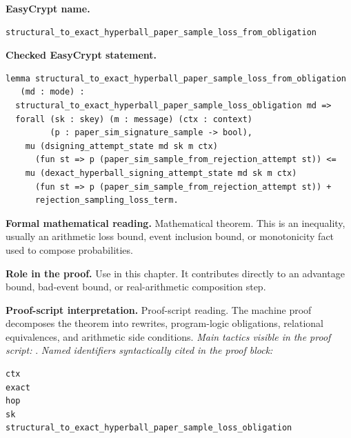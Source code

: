 \begin{formaltheorem}
\noindent\textbf{EasyCrypt name.}
\begin{lstlisting}[language=EasyCrypt,basicstyle=\ttfamily\scriptsize]
structural_to_exact_hyperball_paper_sample_loss_from_obligation
\end{lstlisting}
\noindent\textbf{Checked EasyCrypt statement.}
\begin{lstlisting}[language=EasyCrypt,basicstyle=\ttfamily\scriptsize]
lemma structural_to_exact_hyperball_paper_sample_loss_from_obligation
   (md : mode) :
  structural_to_exact_hyperball_paper_sample_loss_obligation md =>
  forall (sk : skey) (m : message) (ctx : context)
         (p : paper_sim_signature_sample -> bool),
    mu (dsigning_attempt_state md sk m ctx)
      (fun st => p (paper_sim_sample_from_rejection_attempt st)) <=
    mu (dexact_hyperball_signing_attempt_state md sk m ctx)
      (fun st => p (paper_sim_sample_from_rejection_attempt st)) +
      rejection_sampling_loss_term.
\end{lstlisting}
\noindent\textbf{Formal mathematical reading.}
Mathematical theorem. This is an inequality, usually an arithmetic loss bound, event inclusion bound, or monotonicity fact used to compose probabilities.

\noindent\textbf{Role in the proof.}
Use in this chapter. It contributes directly to an advantage bound, bad-event bound, or real-arithmetic composition step.

\noindent\textbf{Proof-script interpretation.}
Proof-script reading. The machine proof decomposes the theorem into rewrites, program-logic obligations, relational equivalences, and arithmetic side conditions.
\emph{Main tactics visible in the proof script:} .
\emph{Named identifiers syntactically cited in the proof block:}
\begin{lstlisting}[language=EasyCrypt,basicstyle=\ttfamily\scriptsize]
ctx
exact
hop
sk
structural_to_exact_hyperball_paper_sample_loss_obligation
\end{lstlisting}

\end{formaltheorem}

